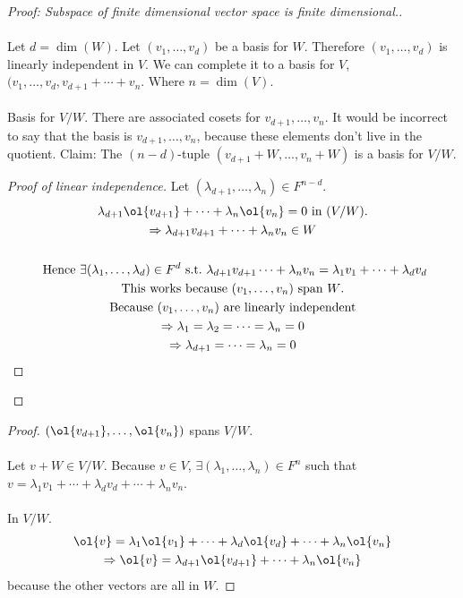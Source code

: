 \documentclass[class=scrartcl, crop=false]{standalone}
\begin{document}
\begin{proof}[Proof: Subspace of finite dimensional vector space is finite dimensional.]
  \leavevmode
  \\\\
  Let $d = \dim(W)$. Let $(v_1, \dots, v_d)$ be a basis for $W$. Therefore $(v_1, \dots, v_d)$ is linearly independent in $V$. We can complete it to a basis for $V$, $(v_1, \dots, v_d, v_{d + 1} + \cdots + v_n$. Where $n = \dim(V)$.
  \\\\
  Basis for $V / W$. There are associated cosets for $v_{d + 1}, \dots, v_n$. It would be incorrect to say that the basis is $v_{d + 1}, \dots, v_n$, because these elements don't live in the quotient. Claim: The $(n - d)$-tuple $(v_{d + 1} + W, \dots, v_n + W)$ is a basis for  $V / W$.
  \begin{proof}[Proof of linear independence]
    Let $(\lambda_{d + 1}, \dots, \lambda_n) \in F^{n - d}$. 
    \begin{gather*}
      \lambda_{d + 1}\ol{v_{d + 1}} + \cdots + \lambda_n \ol{v_n} = 0 \ \text{in} \  (V / W). \\
      \Rightarrow
      \lambda_{d + 1}{v_{d + 1}} + \cdots + \lambda_n {v_n} \in W \\\\
      \ \text{Hence} \ \exists (\lambda_1, \dots, \lambda_d) \in F^d \ \text{s.t.} \ 
      \lambda_{d + 1}v_{d + 1} \cdots + \lambda_n v_n = \lambda_1 v_1 + \cdots + \lambda_d v_d \\
      \ \text{This works because $(v_1, \dots, v_n)$ span $W$.} \ 
      \\
      \ \text{Because} \ (v_1, \dots, v_n) \ \text{are linearly independent} \  \\
      \Rightarrow
      \lambda_1 = \lambda_2 = \cdots = \lambda_n = 0 \\
      \Rightarrow
      \lambda_{d + 1} = \cdots = \lambda_n = 0
    \end{gather*} 
  \end{proof} 
\end{proof} 

\begin{proof}
  $(\ol{ v_{d + 1}}, \dots, \ol{v_n})$ spans $V / W$.
  \\\\
  Let $v + W \in V / W$. Because $v \in V$, $\exists (\lambda_1, \dots, \lambda_n) \in F^n$ such that $v = \lambda_1v_1 + \cdots + \lambda_dv_d + \cdots + \lambda_nv_n$.
  \\\\
  In $V / W$. 
  \begin{gather*}
    \ol{v} = \lambda_1\ol{v_1} + \cdots + \lambda_d\ol{v_d} + \cdots + \lambda_n \ol{v_n} \\
    \Rightarrow \ol{v} = \lambda_{d + 1}\ol{v_{d + 1}} + \cdots + \lambda_n\ol{v_n}
  \end{gather*} 
  because the other vectors are all in $W$.
\end{proof} 
\end{document}
